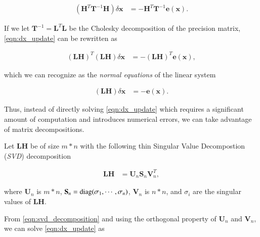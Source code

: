 \begin{equation}\label{eqn:dx_update}
  \begin{aligned}
  (\mathbf{H}^T\mathbf{T}^{-1}\mathbf{H})\delta\mathbf{x} &=
    -\mathbf{H}^T\mathbf{T}^{-1}\mathbf{e}(\mathbf{x}).
  \end{aligned}
\end{equation}

If we let $\mathbf{T}^{-1}=\mathbf{L}^T\mathbf{L}$ be the Cholesky
decomposition of the precision matrix, \eqref{eqn:dx_update} can be rewritten as

\begin{equation}\label{eqn:dx_update_normal}
  \begin{aligned}
  (\mathbf{L}\mathbf{H})^T(\mathbf{L}\mathbf{H})\delta\mathbf{x} &= 
    -(\mathbf{L}\mathbf{H})^T\mathbf{e}(\mathbf{x}),
  \end{aligned}
\end{equation}

which we can recognize as the \emph{normal equations} of the linear system

\begin{equation}\label{eqn:dx_update_standard}
  \begin{aligned}
  (\mathbf{L}\mathbf{H})\delta\mathbf{x} &= -\mathbf{e}(\mathbf{x}).
  \end{aligned}
\end{equation}

Thus, instead of directly solving \eqref{eqn:dx_update} which requires a
significant amount of computation and introduces numerical errors, we can take
advantage of matrix decompositions.

Let $\mathbf{L}\mathbf{H}$ be of size $m*n$ with the following thin
Singular Value Decompostion (\emph{SVD}) decomposition

\begin{equation}\label{eqn:svd_decomposition}
  \begin{aligned}
  \mathbf{L}\mathbf{H} &= \mathbf{U}_n\mathbf{S}_n\mathbf{V}_n^T,
  \end{aligned}
\end{equation}

where $\mathbf{U}_n$ is $m*n$, $\mathbf{S}_n=\operatorname{diag}(\sigma_1, \cdots, \sigma_n)$,
$\mathbf{V}_n$ is $n*n$, and $\sigma_i$ are the singular values of
$\mathbf{L}\mathbf{H}$.

From \eqref{eqn:svd_decomposition} and using the orthogonal property of
$\mathbf{U}_n$ and $\mathbf{V}_n$, we can solve \eqref{eqn:dx_update} as

